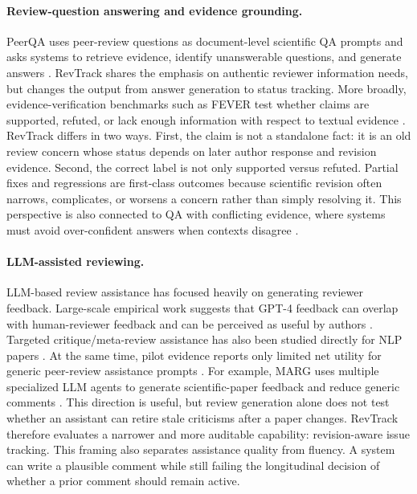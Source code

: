 \paragraph{Review-question answering and evidence grounding.}
PeerQA uses peer-review questions as document-level scientific QA prompts and asks systems to retrieve evidence, identify unanswerable questions, and generate answers \citep{baumgartner-etal-2025-peerqa}.
RevTrack shares the emphasis on authentic reviewer information needs, but changes the output from answer generation to status tracking.
More broadly, evidence-verification benchmarks such as FEVER test whether claims are supported, refuted, or lack enough information with respect to textual evidence \citep{thorne-etal-2018-fever}.
RevTrack differs in two ways.
First, the claim is not a standalone fact: it is an old review concern whose status depends on later author response and revision evidence.
Second, the correct label is not only supported versus refuted.
Partial fixes and regressions are first-class outcomes because scientific revision often narrows, complicates, or worsens a concern rather than simply resolving it.
This perspective is also connected to QA with conflicting evidence, where systems must avoid over-confident answers when contexts disagree \citep{liu-etal-2025-open,shaier-etal-2024-adaptive}.

\paragraph{LLM-assisted reviewing.}
LLM-based review assistance has focused heavily on generating reviewer feedback.
Large-scale empirical work suggests that GPT-4 feedback can overlap with human-reviewer feedback and can be perceived as useful by authors \citep{liang-etal-2023-can}.
Targeted critique/meta-review assistance has also been studied directly for NLP papers \citep{du-etal-2024-llms-assist}.
At the same time, pilot evidence reports only limited net utility for generic peer-review assistance prompts \citep{robertson-2023-gpt4-helpful}.
For example, MARG uses multiple specialized LLM agents to generate scientific-paper feedback and reduce generic comments \citep{darcy-etal-2024-marg}.
This direction is useful, but review generation alone does not test whether an assistant can retire stale criticisms after a paper changes.
RevTrack therefore evaluates a narrower and more auditable capability: revision-aware issue tracking.
This framing also separates assistance quality from fluency.
A system can write a plausible comment while still failing the longitudinal decision of whether a prior comment should remain active.

